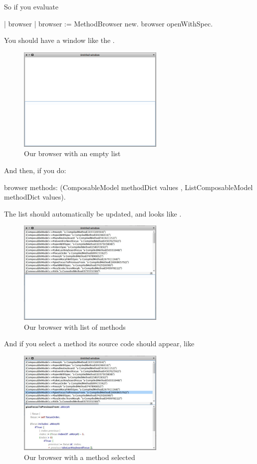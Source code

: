 \documentclass[a4paper,10pt,twoside]{book}
\begin{document}
So if you evaluate
%
\begin{code}{}
| browser |
browser := MethodBrowser new.
browser openWithSpec.
\end{code}
You should have a window like the .
\begin{figure}[ht]
\begin{center}
	\includegraphics[width=7cm]{MethodBrowser1}
	\caption{Our browser with an empty list}
\end{center}
\end{figure}

And then, if you do:
%
\begin{code}{}
browser  methods: (ComposableModel methodDict values , ListComposableModel methodDict values).
\end{code}
The list should automatically be updated, and looks like .
\begin{figure}[ht]
\begin{center}
	\includegraphics[width=7cm]{MethodBrowser2}
	\caption{Our browser with list of methods}
\end{center}
\end{figure}

And if you select a method its source code should appear, like 

\begin{figure}[ht]
\begin{center}
	\includegraphics[width=7cm]{MethodBrowser3}
	\caption{Our browser with a method selected}
\end{center}
\end{figure}
\end{document}
